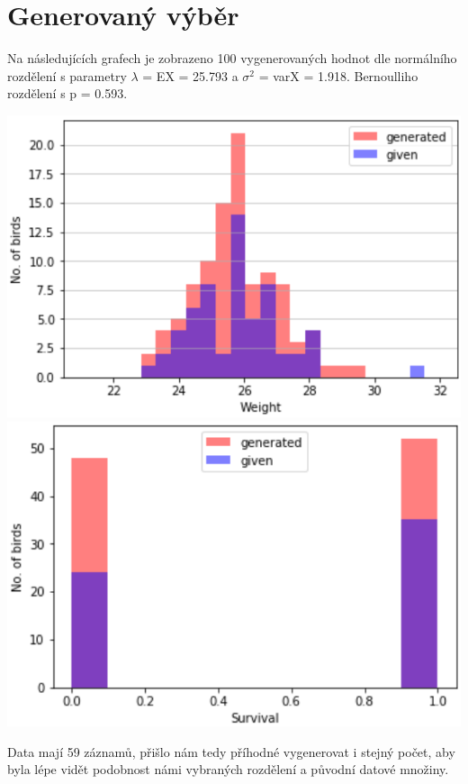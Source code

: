 \documentclass[12pt,a4paper]{article}
\begin{document}
\section{Generovaný výběr}
Na následujících grafech je zobrazeno 100 vygenerovaných hodnot dle normálního rozdělení s parametry $\lambda$ = EX = 25.793 a $\sigma ^2$ = varX = 1.918. Bernoulliho rozdělení s p = 0.593.

\includegraphics[scale=0.31]{gen_weight_graph2}
\includegraphics[scale=0.31]{gen_survival_graph2}

Data mají 59 záznamů, přišlo nám tedy příhodné vygenerovat i stejný počet, aby byla lépe vidět podobnost námi vybraných rozdělení a původní datové množiny.
\end{document}
